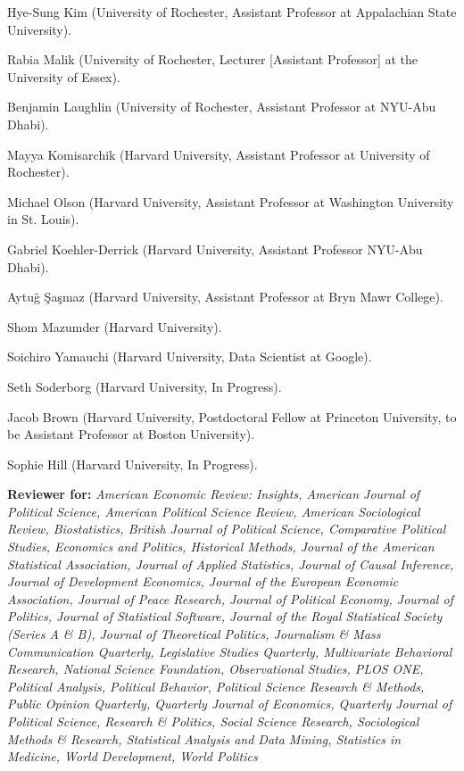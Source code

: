 \documentclass[11pt,article,oneside]{memoir}
\begin{document}
\begin{cvlist}
  \begin{cvlist}
\item Hye-Sung Kim (University of Rochester, Assistant Professor at Appalachian State University).
\item Rabia Malik (University of Rochester, Lecturer [Assistant Professor] at the University of Essex).
\item Benjamin Laughlin (University of Rochester, Assistant Professor at NYU-Abu Dhabi).
\item Mayya Komisarchik (Harvard University, Assistant Professor at University of Rochester).
\item Michael Olson (Harvard University, Assistant Professor at Washington University in St. Louis).
\item Gabriel Koehler-Derrick (Harvard University, Assistant Professor NYU-Abu Dhabi).
\item Aytu\u{g} \c{S}a\c{s}maz (Harvard University, Assistant Professor at Bryn Mawr College).
\item Shom Mazumder (Harvard University).
\item Soichiro Yamauchi (Harvard University, Data Scientist at Google).
\item Seth Soderborg (Harvard University, In Progress).
\item Jacob Brown (Harvard University, Postdoctoral Fellow at Princeton University, to be Assistant Professor at Boston University).
\item Sophie Hill (Harvard University, In Progress).
\end{cvlist} 

\item \textbf{Reviewer for:} \emph{American Economic Review: Insights, American Journal of Political Science, American Political Science Review, American Sociological Review, Biostatistics, British Journal of Political Science, Comparative Political Studies, Economics and Politics, Historical Methods, Journal of the American Statistical Association, Journal of Applied Statistics, Journal of Causal Inference, Journal of Development Economics, Journal of the European Economic Association, Journal of Peace Research, Journal of Political Economy, Journal of Politics, Journal of Statistical Software, Journal of the Royal Statistical Society (Series A \& B), Journal of Theoretical Politics, Journalism \& Mass Communication Quarterly, Legislative Studies Quarterly, Multivariate Behavioral Research, National Science Foundation, Observational Studies, PLOS ONE, Political Analysis, Political Behavior, Political Science Research \& Methods, Public Opinion Quarterly, Quarterly Journal of Economics, Quarterly Journal of Political Science, Research \& Politics, Social Science Research, Sociological Methods \& Research,  Statistical Analysis and Data Mining, Statistics in Medicine, World Development, World Politics} 


\end{cvlist}
\end{document}
